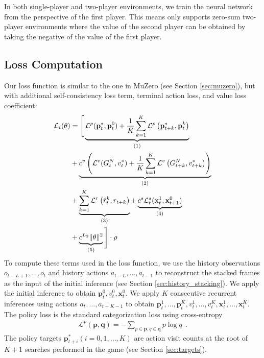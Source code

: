 In both single-player and two-player environments, we train the neural network from the perspective of the first player.
This means \moozi only supports zero-sum two-player environments where the value of the second player can be obtained by taking the negative of the value of the first player.

\subsection{Loss Computation} \label{sec:loss}
Our loss function is similar to the one in MuZero (see Section \ref{sec:muzero}), but with additional self-consistency loss term, terminal action loss, and value loss coefficient:
\begin{align*}
    \mathcal{L}_{t}(\theta)
      & =
    \Bigg[
    \underbrace{\mathcal{L}^p(\mathbf{p}^*_t, \mathbf{p}^0_t) + \frac{1}{K}\sum_{k=1}^{K} \mathcal{L}^{p}\left(\mathbf{p}^*_{t+k}, \mathbf{p}_{t}^{k}\right)}_{(1)}  \\
      & +
    \underbrace{c^v\left(\mathcal{L}^v(G^N_{t}, v^*_t) + \frac{1}{K}\sum_{k=1}^{K} \mathcal{L}^{v}\left(G^N_{t+k}, v^*_{t+k}\right) \right)}_{(2)}  \\
      & +
    \underbrace{\sum_{k=1}^{K} \mathcal{L}^{r}\left(\hat{r}_t^k, r_{t+k}\right)}_{(3)}
    +
    \underbrace{c^{s}\mathcal{L}^s_t(\mathbf{x}^1_t, \mathbf{x}^0_{t+1})}_{(4)}  \\
      & +
    \underbrace{c^{L_2}\|\theta\|^{2}}_{(5)}
    \Bigg] \cdot \rho
    \\
\end{align*}
To compute these terms used in the loss function, we use the history observations \(o_{t-L+1}, \dots, o_t\) and history actions \(a_{t-L}, \dots, a_{t -1}\) to reconstruct the stacked frames as the input of the initial inference (see Section \ref{sec:history_stacking}).
We apply the initial inference to obtain $\mathbf{p}^0_t, v^0_t, \mathbf{x}^0_t$.
We apply $K$ consecutive recurrent inferences using actions \(a_t, \dots, a_{t+K - 1}\) to obtain \(\mathbf{p}^1_t, \dots, \mathbf{p}^K_t, v^1_t, \dots, v^K_t, \mathbf{x}^1_t, \dots, \mathbf{x}^K_t\).
The policy loss  is the standard categorization loss using cross-entropy
\begin{align*}
    \mathcal{L}^p(\mathbf{p}, \mathbf{q}) = - \sum_{p \in \mathbf{p}, q \in \mathbf{q}} p \log{q}  ~~ .
\end{align*}
The policy targets $\mathbf{p}^*_{t+i} (i = 0, 1, \dots, K)$ are action visit counts at the root of $K+1$ searches performed in the game (see Section \ref{sec:targets}).
